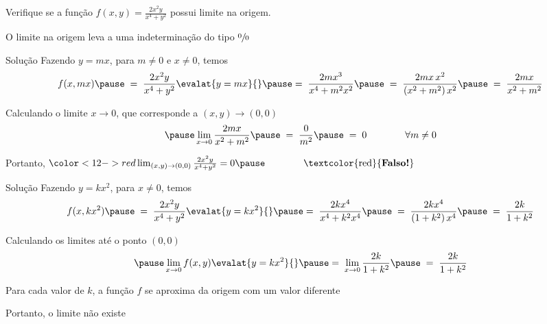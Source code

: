 \begin{question}
  Verifique se a função
  \(
    f(x, y) = \frac{2x^2y}{x^4+y^2}
  \)
  possui limite na origem.

  \pause
  \vspace{\baselineskip}
  O limite na origem leva a uma indeterminação do tipo $\sfrac{0}{0}$
\end{question}

\begin{resolution}{Solução}
  Fazendo \(y=mx\), para \(m\neq 0\) e \(x\neq 0\),
  \pause
  temos
  \[
    f(x, mx)
    \pause
    \;=\; \frac{2x^2y}{x^4+y^2} \evalat{y=mx}{}
    \pause
    =\; \frac{2mx^3}{x^4+m^2x^2}
    \pause
    \;=\; \frac{2mx\,x^2}{\left(x^2+m^2\right)x^2}
    \pause
    \;=\; \frac{2mx}{x^2+m^2}
  \]

  \pause
  Calculando o limite \(x\to 0\), que corresponde a \((x, y)\to (0, 0)\)
  \[
    \pause
    \lim_{x\to 0} \frac{2mx}{x^2+m^2}
    \pause
    \;=\; \frac{0}{m^2}
    \pause
    \;=\; 0
    \qquad\qquad
    \forall m \neq 0
  \]

  \pause
  Portanto,
  \(
    {
      \color<12->{red}
      \lim_{(x, y)\to(0, 0)} \frac{2x^2y}{x^4+y^2} = 0
    }
    \pause
    \qquad
    \qquad
    \text{\textcolor{red}{\textbf{Falso!}}}
  \)
\end{resolution}

\begin{resolution}{Solução}
  Fazendo \(y=kx^2\), para \(x\neq 0\),
  \pause
  temos
  \[
    f(x, kx^2)
    \pause
    \;=\; \frac{2x^2y}{x^4+y^2} \evalat{y=kx^2}{}
    \pause
    =\; \frac{2kx^4}{x^4+k^2x^4}
    \pause
    \;=\; \frac{2kx^4}{\left(1+k^2\right)x^4}
    \pause
    \;=\; \frac{2k}{1+k^2}
  \]

  \pause
  Calculando os limites até o ponto $(0, 0)$
  \[
    \pause
    \lim_{x\to 0} f(x, y)\evalat{y=kx^2}{}
    \pause
    =\; \lim_{x\to 0} \frac{2k}{1+k^2}
    \pause
    \;=\; \frac{2k}{1+k^2}
  \]

  \pause
  Para cada valor de $k$, a função $f$ se aproxima da origem com um valor diferente

  \pause
  Portanto, o limite não existe
\end{resolution}

